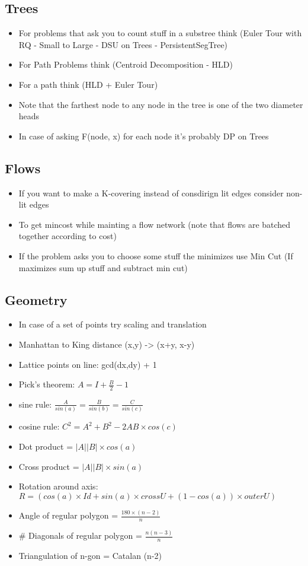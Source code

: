 \subsection{Trees}
\begin{itemize}
\item For problems that ask you to count stuff in a substree think (Euler Tour with RQ - Small to Large - DSU on Trees - PersistentSegTree)
\item For Path Problems think (Centroid Decomposition - HLD)
\item For a path think (HLD + Euler Tour)
\item Note that the farthest node to any node in the tree is one of the two diameter heads
\item In case of asking F(node, x) for each node it's probably DP on Trees
\end{itemize}
\hrulefill 
\subsection{Flows}
\begin{itemize}
\item If you want to make a K-covering instead of consdirign lit edges consider non-lit edges
\item To get mincost while mainting a flow network (note that flows are batched together according to cost)
\item If the problem asks you to choose some stuff the minimizes use Min Cut (If maximizes sum up stuff and subtract min cut)
\end{itemize}
\hrulefill 
\subsection{Geometry}
\begin{itemize}
\item In case of a set of points try scaling and translation
\item Manhattan to King distance (x,y) -> (x+y, x-y)
\item Lattice points on line: gcd(dx,dy) + 1
\item Pick's theorem: $A = I + \frac{B}{2} - 1$
\item sine rule: $\frac{A}{sin(a)} = \frac{B}{sin(b)} = \frac{C}{sin(c)}$
\item cosine rule: $C^2=A^2+B^2-2AB \times cos(c)$
\item Dot product = $|A| |B| \times cos(a)$
\item Cross product = $|A| |B| \times sin(a)$
\item Rotation around axis: $R = (cos(a) \times Id + sin(a) \times cross U + (1 - cos(a)) \times outer U)$
\item Angle of regular polygon = $\frac{180 \times (n-2)}{n}$
\item \# Diagonals of regular polygon = $\frac{n (n-3)}{n}$
\item Triangulation of n-gon = Catalan (n-2)
\end{itemize}
\hrulefill
